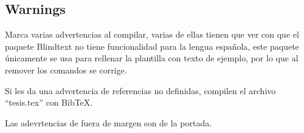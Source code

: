 \documentclass[]{article}
\begin{document}
\subsection{Warnings}\label{warnings}

Marca varias advertencias al compilar, varias de ellas tienen que ver
con que el paquete Blindtext no tiene funcionalidad para la lengua
española, este paquete únicamente se usa para rellenar la plantilla con
texto de ejemplo, por lo que al remover los comandos \blindtext se
corrige.

Si les da una advertencia de referencias no definidas, compilen el
archivo ``tesis.tex'' con BibTeX.

Las adevrtencias de fuera de margen son de la portada.
\end{document}
